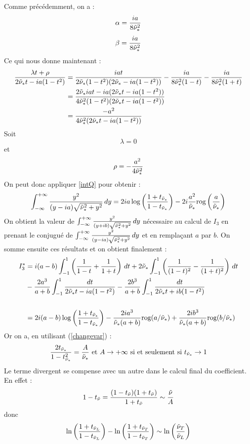 Comme précédemment, on a :
$$ \alpha=\frac{ia}{8\tilde{\nu}_*^2}$$
$$ \beta=\frac{ia}{8\tilde{\nu}_*^2}$$
Ce qui nous donne maintenant :
\begin{equation*}
\begin{split}
 \frac{\lambda t + \rho }{2\tilde{\nu}_* t-ia(1-t^2)} &=\frac{iat}{2\tilde{\nu}_*(1-t^2)(2\tilde{\nu}_*-ia(1-t^2))} -\frac{ia}{8\tilde{\nu}_*^2(1-t)}-\frac{ia}{8\tilde{\nu}_*^2(1+t)} \\
&= \frac{2\tilde{\nu}_* iat-ia(2\tilde{\nu}_*t-ia(1-t^2))}{4\tilde{\nu}_*^2(1-t^2)(2\tilde{\nu}_*t-ia(1-t^2))} \\
&=\frac{-a^2}{4\tilde{\nu}_*^2(2\tilde{\nu}_*t-ia(1-t^2))}
\end{split}
\end{equation*}
Soit 
$$\lambda=0$$
et
$$\rho=-\frac{a^2}{4\tilde{\nu}_*^2}$$
On peut donc appliquer \eqref{intQ} pour obtenir :
\begin{equation}
\int_{-\infty}^{+\infty} \frac{y^2}{(y-ia)\sqrt{\tilde{\nu}_*^2+y^2}} \, dy =2ia\log\left(\frac{1+t_{\tilde{\nu}_*}}{1-t_{\tilde{\nu}_*}}\right)-2i\frac{a^2}{\tilde{\nu}_*}\mbox{rog}\left(\frac{a}{\tilde{\nu}_*}\right)
\label{y2_D}
\end{equation}
On obtient la valeur de  $\int_{-\infty}^{+\infty} \frac{y^2}{(y+ib)\sqrt{\tilde{\nu}_*^2+y^2}} \, dy $ nécessaire au calcul de $I_3$ en prenant le conjugué de $\int_{-\infty}^{+\infty} \frac{y^2}{(y-ia)\sqrt{\tilde{\nu}_*^2+y^2}} \, dy $ et en remplaçant $a$ par $b$. On somme ensuite ces résultats et on obtient finalement :
\begin{equation*}
\begin{split}
I_3^*&=i(a-b)\int_{-1}^1 \left( \frac{1}{1-t}+\frac{1}{1+t} \right) \, dt+ 2\tilde{\nu}_* \int_{-1}^1 \left( \frac{1}{(1-t)^2}-\frac{1}{(1+t)^2} \right) \, dt \\
 &-\frac{2a^3}{a+b}\int_{-1}^1\frac{dt}{2\tilde{\nu}_*t-ia(1-t^2)}-\frac{2b^3}{a+b}\int_{-1}^1\frac{dt}{2\tilde{\nu}_*t+ib(1-t^2)}\\
 ~\\
 &=2i(a-b)\log\left(\frac{1+t_{\tilde{\nu}_*}}{1-t_{\tilde{\nu}_*}}\right)-\frac{2ia^3}{\tilde{\nu}_*(a+b)}\mbox{rog}(a/\tilde{\nu}_*)+\frac{2ib^3}{\tilde{\nu}_*(a+b)}\mbox{rog}(b/\tilde{\nu}_*) 
\end{split}
\end{equation*}
Or on a, en utilisant (\ref{changevar}) :
$$ \frac{2t_{\tilde{\nu}_*}}{1-t_{\tilde{\nu}_*}^2}=\frac{A}{\tilde{\nu}_*} \mbox{ et } A\rightarrow + \infty \mbox{ si et seulement si } t_{\tilde{\nu}_*} \rightarrow 1$$
Le terme divergent se compense avec un autre dans le calcul final du coefficient. En effet :
$$1-t_{\tilde{\nu}} =\frac{(1-t_{\tilde{\nu}})(1+t_{\tilde{\nu}})}{1+t_{\tilde{\nu}}} \sim \frac{\tilde{\nu}}{A}$$
donc
\begin{equation}
\ln\left(\frac{1+t_{\tilde{\nu}_L}}{1-t_{\tilde{\nu}_L}}\right)- \ln\left(\frac{1+t_{\tilde{\nu}_T}}{1-t_{\tilde{\nu}_T}}\right)\sim \ln\left(\frac{\tilde{\nu}_T}{\tilde{\nu}_L}\right) 
\label{compensation}
\end{equation}
